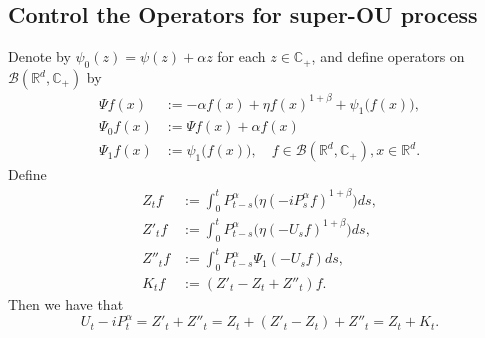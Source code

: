 \documentclass[12pt,a4paper]{amsart}
\theoremstyle{plain}
\theoremstyle{definition}
\numberwithin{equation}{section}
\begin{document}
\subsection{Control the Operators for super-OU process}
    Denote by $\psi_0(z) = \psi(z) + \alpha z$ for each $z\in \mathbb C_+$, and define operators on $\mathcal B(\mathbb R^d, \mathbb C_+)$ by
\begin{equation}\begin{split}
    \Psi f (x) &:= -\alpha f(x) + \eta f(x)^{1+\beta} + \psi_1\big(f(x)\big),
    \\\Psi_0 f(x) &:= \Psi f(x) + \alpha f(x)
    \\ \Psi_1 f(x) &:= \psi_1 \big(f(x)\big), 
    \quad  f\in \mathcal B(\mathbb R^d, \mathbb C_+), x\in \mathbb R^d.
\end{split}\end{equation}   
    Define
\begin{equation}\begin{split}
\label{eq: def of Zf}
    Z_t f 
    &:= \int_0^t P^\alpha_{t-s}\big( \eta (-i P^\alpha_sf)^{1+\beta}\big)ds,
    \\ Z'_t f
    &:= \int_0^t P^\alpha_{t-s}\big( \eta (-U_s f)^{1+\beta}\big)ds,
    \\ Z''_t f
    &:= \int_0^t P^\alpha_{t-s}\Psi_1(-U_s f)ds,
    \\ K_t f
    &:= (Z'_t - Z_t+ Z''_t)f.
\end{split}\end{equation}
    Then we have that
\[
    U_t - i P^\alpha_t 
    = Z'_t + Z''_t 
    = Z_t+ (Z'_t - Z_t) + Z''_t
    = Z_t+K_t.
\]
\end{document}
